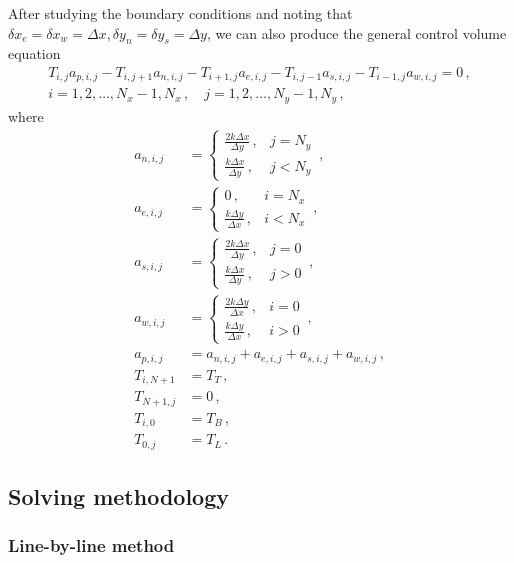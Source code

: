\documentclass{article}
\begin{document}
After studying the boundary conditions and noting that $\delta x_e = \delta x_w = \Delta x, \delta y_n = \delta y_s = \Delta y$, we can also produce the general control volume equation
\begin{multline}
	\label{eq:CV}
	T_{i,j} a_{p,i,j} - T_{i, j+1} a_{n,i,j} - T_{i+1, j} a_{e,i,j} - T_{i, j-1} a_{s,i,j} - T_{i-1, j} a_{w,i,j} = 0\,,\\ i = 1, 2, \ldots, N_x - 1, N_x\,, \quad j = 1, 2, \ldots, N_y - 1, N_y\,,
\end{multline}
where
\begin{align*}
	a_{n,i,j} & = \begin{cases}
		\frac{2 k \Delta x}{\Delta y}\,, & j = N_y \\
		\frac{k \Delta x}{\Delta y}\,, & j < N_y
	\end{cases}\,, \\
	a_{e,i,j} & = \begin{cases}
		0\,, & i = N_x \\
		\frac{k \Delta  y}{\Delta x}\,, & i < N_x
	\end{cases}\,, \\
	a_{s,i,j} & = \begin{cases}
		\frac{2 k \Delta x}{\Delta y}\,, & j = 0 \\
		\frac{k \Delta x}{\Delta y}\,, & j > 0
	\end{cases}\,, \\
	a_{w,i,j} & = \begin{cases}
		\frac{2 k \Delta y}{\Delta x}\,, & i = 0 \\
		\frac{k \Delta y}{\Delta x}\,, & i > 0
	\end{cases}\,, \\
	a_{p,i,j} & = a_{n,i,j} + a_{e,i,j} + a_{s,i,j} + a_{w,i,j}\,, \\
	T_{i, N+1} & = T_T\,, \\
	T_{N+1, j} & = 0\,, \\
	T_{i, 0} & = T_B\,, \\
	T_{0,j} & = T_L\,.
\end{align*}

\subsection*{Solving methodology}

\subsubsection*{Line-by-line method}
\end{document}
